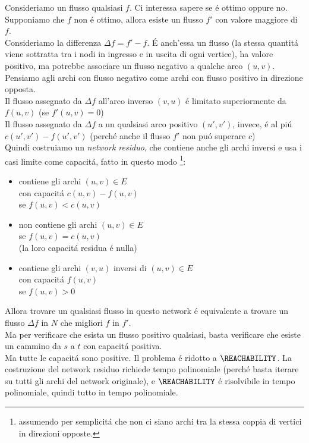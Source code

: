 Consideriamo un flusso qualsiasi $f$. Ci interessa sapere se é ottimo oppure no. \\
Supponiamo che $f$ non é ottimo, allora esiste un flusso $f'$ con valore maggiore di $f$. \\
Consideriamo la differenza $\Delta f = f' - f$. É anch'essa un flusso 
(la stessa quantitá viene sottratta tra i nodi in ingresso e in uscita di ogni vertice), 
ha valore positivo, ma potrebbe associare un flusso negativo a qualche arco $(u,v)$. \\
Pensiamo agli archi con flusso negativo come archi con flusso positivo in direzione opposta. \\
Il flusso assegnato da $\Delta f$ all'arco inverso $(v,u)$ é limitato superiormente da $f(u,v)$ 
(se $f'(u,v) = 0$) \\
Il flusso assegnato da $\Delta f$ a un qualsiasi arco positivo $(u', v')$, invece, é al piú $c(u', v') - f(u', v')$
(perché anche il flusso $f'$ non puó superare $c$) \\
Quindi costruiamo un \textit{network residuo}, 
che contiene anche gli archi inversi e usa i casi limite come capacitá,
fatto in questo modo
\footnote{assumendo per semplicitá che non ci siano archi 
tra la stessa coppia di vertici in direzioni opposte.}:
\begin{itemize}
	\item contiene gli archi $(u,v) \in E$ \\ 
    con capacitá $c(u,v) - f(u,v)$ \\
    se $f(u,v) < c(u,v)$
	\item non contiene gli archi $(u,v) \in E$ \\
    se $f(u, v) = c(u, v)$ \\
    (la loro capacitá residua é nulla)
	\item contiene gli archi $(v,u)$ inversi di $(u,v) \in E$ \\
    con capacitá $f(u,v)$ \\
    se $f(u,v) > 0$
\end{itemize}
Allora trovare un qualsiasi flusso in questo network é equivalente a trovare 
un flusso $\Delta f$ in $N$ che migliori $f$ in $f'$. \\
Ma per verificare che esista un flusso positivo qualsiasi, basta verificare 
che esiste un cammino da $s$ a $t$ con capacitá positiva. \\
Ma tutte le capacitá sono positive. Il problema é ridotto a $\REACHABILITY$.
La costruzione del network residuo richiede tempo polinomiale
(perché basta iterare su tutti gli archi del network originale), 
e $\REACHABILITY$ é risolvibile in tempo polinomiale, 
quindi tutto in tempo polinomiale.

